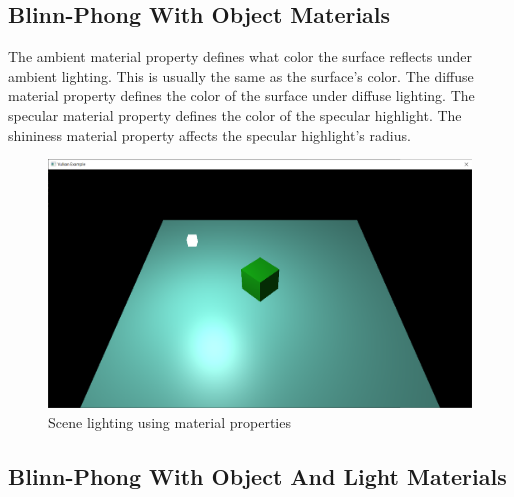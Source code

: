 \begin{minipage}{\linewidth}{\noindent}
    
\end{minipage}

\subsection{Blinn-Phong With Object Materials}

The ambient material property defines what color the surface reflects
under ambient lighting.
This is usually the same as the surface's color.
The diffuse material property defines the color of the surface under
diffuse lighting.
The specular material property defines the color of the specular highlight.
The shininess material property affects the specular highlight's radius.

\begin{figure}[H]
    \centering
    \includegraphics[scale=0.25]{images/ChBlinnPhong/SceneMaterials.png}
    \caption{Scene lighting using material properties}
    \label{fig::SceneMaterials}
\end{figure}

\begin{minipage}{\linewidth}{\noindent}
    
\end{minipage}

\subsection{Blinn-Phong With Object And Light Materials}

